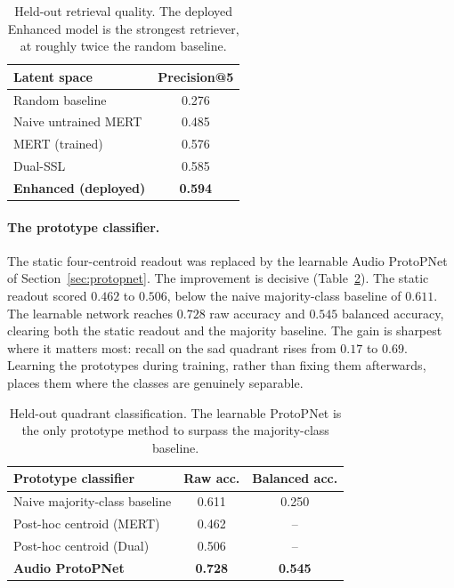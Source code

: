 \documentclass[12pt]{report}
\begin{document}
\begin{table}[t]
\centering
\small
\begin{tabular}{lc}
\toprule
\textbf{Latent space} & \textbf{Precision@5} \\
\midrule
Random baseline                  & 0.276 \\
Naive untrained MERT             & 0.485 \\
MERT (trained)                   & 0.576 \\
Dual-SSL                         & 0.585 \\
\textbf{Enhanced (deployed)}     & \textbf{0.594} \\
\bottomrule
\end{tabular}
\caption{Held-out retrieval quality. The deployed Enhanced model is the strongest retriever, at roughly twice the random baseline.}
\label{tab:retrieval}
\end{table}

\label{sec:results-protopnet}
\paragraph{The prototype classifier.} The static four-centroid readout was replaced by the learnable Audio ProtoPNet of Section~\ref{sec:protopnet}. The improvement is decisive (Table~\ref{tab:protopnet}). The static readout scored $0.462$ to $0.506$, below the naive majority-class baseline of $0.611$. The learnable network reaches $0.728$ raw accuracy and $0.545$ balanced accuracy, clearing both the static readout and the majority baseline. The gain is sharpest where it matters most: recall on the sad quadrant rises from $0.17$ to $0.69$. Learning the prototypes during training, rather than fixing them afterwards, places them where the classes are genuinely separable.

\begin{table}[t]
\centering
\small
\begin{tabular}{lcc}
\toprule
\textbf{Prototype classifier} & \textbf{Raw acc.} & \textbf{Balanced acc.} \\
\midrule
Naive majority-class baseline    & 0.611 & 0.250 \\
Post-hoc centroid (MERT)         & 0.462 & -- \\
Post-hoc centroid (Dual)         & 0.506 & -- \\
\textbf{Audio ProtoPNet}         & \textbf{0.728} & \textbf{0.545} \\
\bottomrule
\end{tabular}
\caption{Held-out quadrant classification. The learnable ProtoPNet is the only prototype method to surpass the majority-class baseline.}
\label{tab:protopnet}
\end{table}
\end{document}
